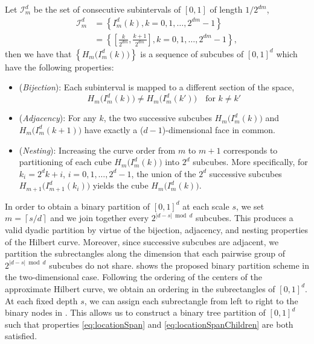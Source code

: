 \documentclass[nonatbib]{elsarticle}
\begin{document}
Let $\mathcal{I}_m^{d}$ be the set of consecutive subintervals of $[0,1]$ of length $1 / 2^{d m}$,
\[
    \begin{aligned}
            \mathcal{I}_{m}^{d} & = \left\{ I_{m}^{d}(k), k = 0, 1, \ldots, 2^{dm} - 1\right\}\\
            &=  \left\{ \left[ \frac{k}{2^{dm}}, \frac{k+1}{2^{d m}} \right], k = 0, 1, \ldots, 2^{d m} - 1 \right\},
    \end{aligned}
\]
then we have that $\left\{ H_m\big( I_m^{d}(k) \big) \right\}$ is a sequence of subcubes of $[0,1]^{d}$ which have the following properties:
\begin{itemize}
    \item \label{item:bijection} (\textit{Bijection}): Each subinterval is mapped to a different section of the space,
        \[
                    H_m \big( I_{m}^{d}(k) \big) \neq  H_m \big( I_{m}^{d}(k') \big) \quad \text{for } k \neq  k'
        \]

    \item \label{item:adjacency} (\textit{Adjacency}): For any $k$, the two successive subcubes $H_m \big( I_{m}^{d}(k) \big)$ and $ H_m \big( I_{m}^{d}(k + 1) \big)$ have exactly a ($d-1$)-dimensional face in common.
        
    \item \label{item:nesting} (\textit{Nesting}): Increasing the curve order from $m$ to $m+1 $ corresponds to partitioning of each cube $H_m\big( I_m^{d}(k) \big)$ into $2^{d}$ subcubes.
        More specifically, for $k_{i} = 2^{d}k + i$, $i = 0, 1, \ldots, 2^{d} - 1$, the union of the $2^{d}$ successive subcubes $H_{m+1}\big( I_{m+1}^{d}(k_{i}) \big)$ yields the cube $H_{m}\big( I_{m}^{d}(k) \big)$.
\end{itemize}

In order to obtain a binary partition of $[0,1]^{d}$ at each scale $s$, we set $m = \left\lceil s / d \right\rceil $ and we join together every $2^{|d-s| \bmod d}$ subcubes.
This produces a valid dyadic partition by virtue of the bijection, adjacency, and nesting properties of the Hilbert curve.
Moreover, since successive subcubes are adjacent, we partition the subrectangles along the dimension that each pairwise group of $2^{|d-s| \bmod d}$ subcubes do not share.
 shows the proposed binary partition scheme in the two-dimensional case.
Following the ordering of the centers of the approximate Hilbert curve, we obtain an ordering in the subrectangles of $[0,1]^{d}$.
At each fixed depth $s$, we can assign each subrectangle from left to right to the binary nodes in .
This allows us to construct a binary tree partition of $[0,1]^{d}$ such that properties \eqref{eq:locationSpan} and \eqref{eq:locationSpanChildren} are both satisfied.
\end{document}
